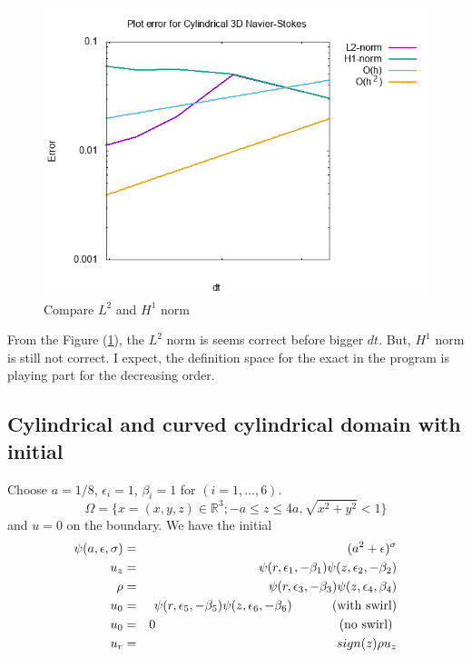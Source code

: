 \documentclass[a4paper]{article}
\newcommand{\R}{\mathbb{R}}
\begin{document}
\begin{figure}[h!]
	\centering
	\includegraphics[width=1\linewidth]{NS_3D/error_cyl}
	\caption{Compare $ L^{2} $ and $ H^{1} $ norm}
	\label{fig:errorcyl}
\end{figure}

From the Figure (\ref{fig:errorcyl}), the $ L^{2} $ norm is seems correct before bigger $ dt $. But, $ H^{1} $ norm is still not correct. I expect, the definition space for the exact in the program is playing part for the decreasing order.

\subsection{Cylindrical and curved cylindrical domain with initial}
Choose $ a=1/8 $, $ \epsilon_{i}=1 $, $ \beta_{i}=1 $ for $ (i=1, \dots,6) $.
\[ \Omega = \{ x=(x,y,z) \in \R^3 ; -a\leq z \leq 4a, \sqrt{x^2+y^2} < 1 \} \]
and $ u=0 $ on the boundary. We have the initial
\begin{eqnarray}\nonumber
\psi(a,\epsilon,\sigma) &=& (a^{2}+\epsilon)^{\sigma}\\ \nonumber
u_{z} &=& \psi(r,\epsilon_{1},-\beta_{1})\psi(z,\epsilon_{2},-\beta_{2})\\ \nonumber
\rho &=& \psi(r,\epsilon_{3},-\beta_{3})\psi(z,\epsilon_{4},\beta_{4})\\ \nonumber
u_{0} &=& \psi(r,\epsilon_{5},-\beta_{5})\psi(z,\epsilon_{6},-\beta_{6}) \text{\hspace{1cm} (with swirl)}\\ \nonumber
u_{0} &=& 0 \text{ \hspace{5cm}(no swirl) }\\ \nonumber
u_{r} &=& sign(z)\rho u_{z}
\end{eqnarray}
\end{document}
